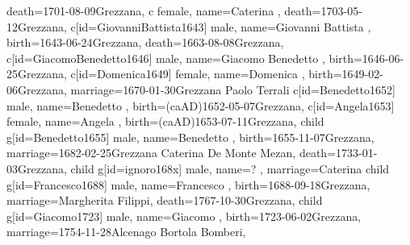 \documentclass{article}
\begin{document}
\begin{midpage}
\begin{center}
\begin{genealogypicture}
{{{{{{                        death={1701-08-09}{Grezzana},
                    }
                    c{
                        female,
                        name={Caterina },
                        death={1703-05-12}{Grezzana},
                    }
                }
            }
            c[id=GiovanniBattista1643]{
                male,
                name={Giovanni Battista },
                birth={1643-06-24}{Grezzana},
                death={1663-08-08}{Grezzana},
            }
            c[id=GiacomoBenedetto1646]{
                male,
                name={Giacomo Benedetto },
                birth={1646-06-25}{Grezzana},
            }
            c[id=Domenica1649]{
                female,
                name={Domenica },
                birth={1649-02-06}{Grezzana},
                marriage={1670-01-30}{Grezzana \newline Paolo Terrali}
            }
            c[id=Benedetto1652]{
                male,
                name={Benedetto },
                birth={(caAD)1652-05-07}{Grezzana},
            }
            c[id=Angela1653]{
                female,
                name={Angela },
                birth={(caAD)1653-07-11}{Grezzana},
            }
            child{
                g[id=Benedetto1655]{
                    male,
                    name={Benedetto },
                    birth={1655-11-07}{Grezzana},
                    marriage={1682-02-25}{Grezzana \newline Caterina De Monte Mezan},
                    death={1733-01-03}{Grezzana},
                }
                child{
                    g[id=ignoro168x]{
                        male,
                        name={? },
                        marriage={Caterina }{}
                    }
                }
                child{
                    g[id=Francesco1688]{
                        male,
                        name={Francesco },
                        birth={1688-09-18}{Grezzana},
                        marriage={Margherita Filippi}{},
                        death={1767-10-30}{Grezzana},
                    }
                    child{
                        g[id=Giacomo1723]{
                            male,
                            name={Giacomo },
                            birth={1723-06-02}{Grezzana},
                            marriage={1754-11-28}{Alcenago \newline Bortola Bomberi},
}}}}}}}
\end{genealogypicture}
\end{center}
\end{midpage}
\end{document}
